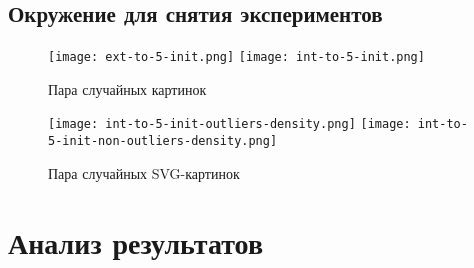 \subsection{Окружение для снятия экспериментов}

\clearpage

\begin{figure}[H]
    \texttt{[image: ext-to-5-init.png]}
    \texttt{[image: int-to-5-init.png]} \label{length_entropy}
    \caption{Пара случайных картинок}
\end{figure}

\begin{figure}[H]
    \texttt{[image: int-to-5-init-outliers-density.png]}
    \texttt{[image: int-to-5-init-non-outliers-density.png]} \label{length_entropy}
    \caption{Пара случайных SVG-картинок}
\end{figure}

\clearpage

\section{Анализ результатов}

\clearpage
